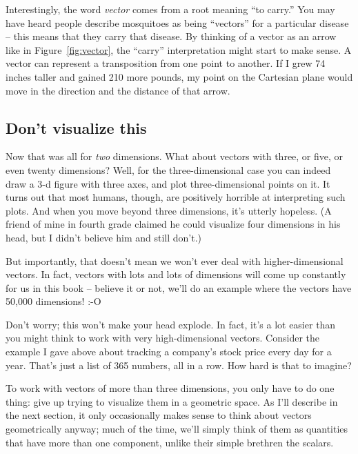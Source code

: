 
Interestingly, the word \textit{vector} comes from a root meaning ``to carry.''
You may have heard people describe mosquitoes as being ``vectors'' for a
particular disease -- this means that they carry that disease. By thinking of a
vector as an arrow like in Figure~\ref{fig:vector}, the ``carry''
interpretation might start to make sense. A vector can represent a
transposition from one point to another. If I grew 74 inches taller and gained
210 more pounds, my point on the Cartesian plane would move in the direction
and the distance of that arrow.

\subsection{Don't visualize this}

Now that was all for \textit{two} dimensions. What about vectors with three, or
five, or even twenty dimensions? Well, for the three-dimensional case you can
indeed draw a 3-d figure with three axes, and plot three-dimensional points on
it. It turns out that most humans, though, are positively horrible at
interpreting such plots. And when you move beyond three dimensions, it's
utterly hopeless. (A friend of mine in fourth grade claimed he could visualize
four dimensions in his head, but I didn't believe him and still don't.)

But importantly, that doesn't mean we won't ever deal with higher-dimensional
vectors. In fact, vectors with lots and lots of dimensions will come up
constantly for us in this book -- believe it or not, we'll do an example where
the vectors have 50,000 dimensions! :-O

Don't worry; this won't make your head explode. In fact, it's a lot easier than
you might think to work with very high-dimensional vectors. Consider the
example I gave above about tracking a company's stock price every day for a
year. That's just a list of 365 numbers, all in a row. How hard is that to
imagine?

To work with vectors of more than three dimensions, you only have to do one
thing: give up trying to visualize them in a geometric space. As I'll describe
in the next section, it only occasionally makes sense to think about vectors
geometrically anyway; much of the time, we'll simply think of them as
quantities that have more than one component, unlike their simple brethren the
scalars.

\smallskip

